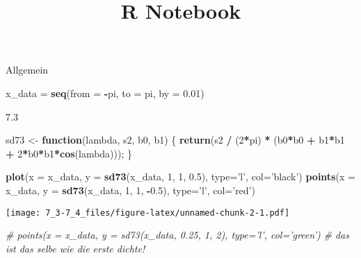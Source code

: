 \documentclass[]{article}
\title{R Notebook}
\author{}
\date{}
\newenvironment{Shaded}{\begin{snugshade}}{\end{snugshade}}
\newcommand{\KeywordTok}[1]{\textcolor[rgb]{0.13,0.29,0.53}{\textbf{#1}}}
\newcommand{\DataTypeTok}[1]{\textcolor[rgb]{0.13,0.29,0.53}{#1}}
\newcommand{\DecValTok}[1]{\textcolor[rgb]{0.00,0.00,0.81}{#1}}
\newcommand{\FloatTok}[1]{\textcolor[rgb]{0.00,0.00,0.81}{#1}}
\newcommand{\StringTok}[1]{\textcolor[rgb]{0.31,0.60,0.02}{#1}}
\newcommand{\CommentTok}[1]{\textcolor[rgb]{0.56,0.35,0.01}{\textit{#1}}}
\newcommand{\ControlFlowTok}[1]{\textcolor[rgb]{0.13,0.29,0.53}{\textbf{#1}}}
\newcommand{\OperatorTok}[1]{\textcolor[rgb]{0.81,0.36,0.00}{\textbf{#1}}}
\newcommand{\NormalTok}[1]{#1}
\begin{document}
\maketitle

Allgemein

\begin{Shaded}
\begin{Highlighting}[]
\NormalTok{x_data =}\StringTok{ }\KeywordTok{seq}\NormalTok{(}\DataTypeTok{from =} \OperatorTok{-}\NormalTok{pi, }\DataTypeTok{to =}\NormalTok{ pi, }\DataTypeTok{by =} \FloatTok{0.01}\NormalTok{)}
\end{Highlighting}
\end{Shaded}

7.3

\begin{Shaded}
\begin{Highlighting}[]
\NormalTok{sd73 <-}\StringTok{ }\ControlFlowTok{function}\NormalTok{(lambda, s2, b0, b1) \{}
  \KeywordTok{return}\NormalTok{(s2 }\OperatorTok{/}\StringTok{ }\NormalTok{(}\DecValTok{2}\OperatorTok{*}\NormalTok{pi) }\OperatorTok{*}\StringTok{ }\NormalTok{(b0}\OperatorTok{*}\NormalTok{b0 }\OperatorTok{+}\StringTok{ }\NormalTok{b1}\OperatorTok{*}\NormalTok{b1 }\OperatorTok{+}\StringTok{ }\DecValTok{2}\OperatorTok{*}\NormalTok{b0}\OperatorTok{*}\NormalTok{b1}\OperatorTok{*}\KeywordTok{cos}\NormalTok{(lambda)));}
\NormalTok{\}}

\KeywordTok{plot}\NormalTok{(}\DataTypeTok{x =}\NormalTok{ x_data, }\DataTypeTok{y =} \KeywordTok{sd73}\NormalTok{(x_data, }\DecValTok{1}\NormalTok{, }\DecValTok{1}\NormalTok{, }\FloatTok{0.5}\NormalTok{), }\DataTypeTok{type=}\StringTok{'l'}\NormalTok{, }\DataTypeTok{col=}\StringTok{'black'}\NormalTok{)}
\KeywordTok{points}\NormalTok{(}\DataTypeTok{x =}\NormalTok{ x_data, }\DataTypeTok{y =} \KeywordTok{sd73}\NormalTok{(x_data, }\DecValTok{1}\NormalTok{, }\DecValTok{1}\NormalTok{, }\OperatorTok{-}\FloatTok{0.5}\NormalTok{), }\DataTypeTok{type=}\StringTok{'l'}\NormalTok{, }\DataTypeTok{col=}\StringTok{'red'}\NormalTok{)}
\end{Highlighting}
\end{Shaded}

\texttt{[image: 7\_3-7\_4\_files/figure-latex/unnamed-chunk-2-1.pdf]}

\begin{Shaded}
\begin{Highlighting}[]
\CommentTok{# points(x = x_data, y = sd73(x_data, 0.25, 1, 2), type='l', col='green')}
\CommentTok{# das ist das selbe wie die erste dichte!}
\end{Highlighting}
\end{Shaded}
\end{document}

